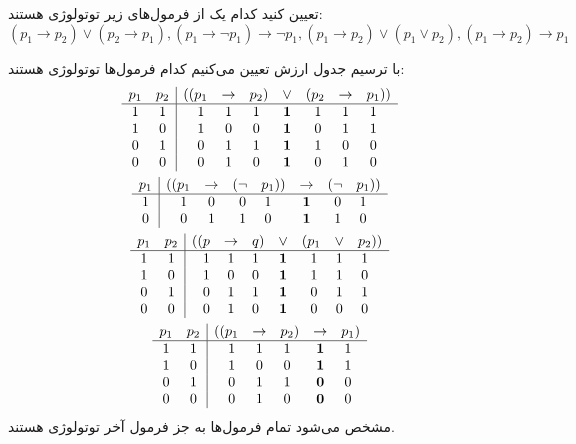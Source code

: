تعیین کنید کدام یک از فرمول‌های زیر توتولوژی هستند:
$$
(p_1\to p_2)\vee (p_2\to p_1),(p_1\to \neg p_1)\to \neg p_1,(p_1\to p_2)\vee (p_1\vee p_2),(p_1\to p_2)\to p_1
$$
\begin{ans}
    با ترسیم جدول ارزش تعیین می‌کنیم کدام فرمول‌ها توتولوژی هستند:
    \begin{gather*}
        \begin{array}{cc|c@{}c@{}ccc@{}ccc@{}ccc@{}c@{}c}
            p_1&p_2&(&(&p_1&\rightarrow&p_2&)&\lor&(&p_2&\rightarrow&p_1&)&)\\\hline
            1&1&&&1&1&1&&\mathbf{1}&&1&1&1&&\\
            1&0&&&1&0&0&&\mathbf{1}&&0&1&1&&\\
            0&1&&&0&1&1&&\mathbf{1}&&1&0&0&&\\
            0&0&&&0&1&0&&\mathbf{1}&&0&1&0&&
        \end{array} \\
        \begin{array}{c|c@{}c@{}ccc@{}cc@{}c@{}ccc@{}cc@{}c@{}c}
            p_1&(&(&p_1&\rightarrow&(&\lnot&p_1&)&)&\rightarrow&(&\lnot&p_1&)&)\\\hline
            1&&&1&0&&0&1&&&\mathbf{1}&&0&1&&\\
            0&&&0&1&&1&0&&&\mathbf{1}&&1&0&&
        \end{array} \\
        \begin{array}{cc|c@{}c@{}ccc@{}ccc@{}ccc@{}c@{}c}
            p_1&p_2&(&(&p&\rightarrow&q&)&\lor&(&p_1&\lor&p_2&)&)\\\hline
            1&1&&&1&1&1&&\mathbf{1}&&1&1&1&&\\
            1&0&&&1&0&0&&\mathbf{1}&&1&1&0&&\\
            0&1&&&0&1&1&&\mathbf{1}&&0&1&1&&\\
            0&0&&&0&1&0&&\mathbf{1}&&0&0&0&&
        \end{array} \\
        \begin{array}{cc|c@{}c@{}ccc@{}ccc@{}c}
            p_1&p_2&(&(&p_1&\rightarrow&p_2&)&\rightarrow&p_1&)\\\hline
            1&1&&&1&1&1&&\mathbf{1}&1&\\
            1&0&&&1&0&0&&\mathbf{1}&1&\\
            0&1&&&0&1&1&&\mathbf{0}&0&\\
            0&0&&&0&1&0&&\mathbf{0}&0&
        \end{array}
    \end{gather*}
    مشخص می‌شود تمام فرمول‌ها به جز فرمول آخر توتولوژی هستند.
\end{ans}
